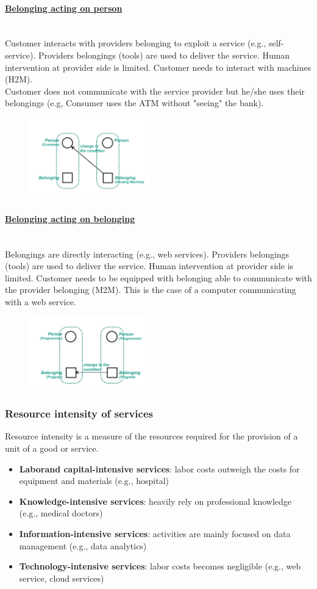 \documentclass[10pt,a4paper]{article}
\newcommand{\myparagraph}[1]{\paragraph{\uline{#1}}\mbox{}\\[0.05in]}
\begin{document}
\myparagraph{Belonging acting on person}
Customer interacts with providers belonging to exploit a service (e.g., self-service). Providers belongings (tools) are used to deliver the service. Human intervention at provider side is limited. Customer needs to interact with machines (H2M). \\ 
Customer does not communicate with the service provider but he/she uses their belongings (e.g, Consumer uses the ATM without "seeing" the bank). 
\begin{figure}[h!]
 \hfill \includegraphics[width=150pt]{images/belonging-person}\hspace*{\fill}
  \label{fig:belonging-person}
\end{figure}
\myparagraph{Belonging acting on belonging}
Belongings are directly interacting (e.g., web services). Providers belongings (tools) are used to deliver the service. Human intervention at provider side is limited. Customer needs to be equipped with belonging able to communicate with the provider belonging (M2M). This is the case of a computer communicating with a web service.
\begin{figure}[h!]
 \hfill \includegraphics[width=150pt]{images/belonging-belonging}\hspace*{\fill}
  \label{fig:belonging-belonging}
\end{figure}
\subsubsection{Resource intensity of services}
Resource intensity is a measure of the resources required for the provision of a unit of a good or service.
\begin{itemize}
	\item \textbf{Laborand capital-intensive services}: labor costs outweigh the costs for equipment and materials (e.g., hospital)
	\item \textbf{Knowledge-intensive services}: heavily rely on professional knowledge (e.g., medical doctors)
	\item \textbf{Information-intensive services}: activities are mainly focused on data management (e.g., data analytics)
	\item \textbf{Technology-intensive services}: labor costs becomes negligible (e.g., web service, cloud services)
\end{itemize}
\end{document}
